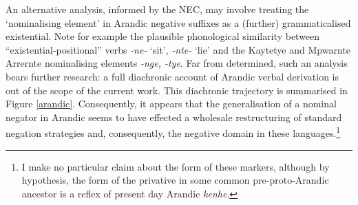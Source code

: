 {	An alternative analysis, informed by the NEC, may involve treating the `nominalising element' in Arandic negative suffixes as a (further) grammaticalised existential. Note for example the plausible phonological similarity between ``existential-positional'' verbs \textit{-ne-} `sit', \textit{-nte-} `lie' and the Kaytetye and Mpwarnte Arrernte nominalising elements \textit{-nge, -tye}. Far from determined, such an analysis bears further research: a full diachronic account of Arandic verbal derivation is out of the scope of the current work.} This diachronic trajectory is summarised in Figure \ref{arandic}. %
Consequently, it appears that the generalisation of a nominal negator in Arandic seems to have effected a wholesale restructuring of standard negation strategies and, consequently, the negative domain in these languages.\footnote{I make no particular claim about the form of these markers, although by hypothesis, the form of the privative in some common pre-proto-Arandic ancestor is a reflex of present day Arandic \textit{\textdblhyphen kenhe}.}
